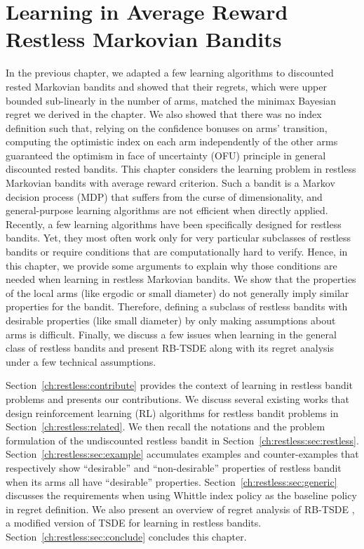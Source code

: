 \begingroup

\let\clearpage\relax

\chapter{Learning in Average Reward Restless Markovian Bandits}
\label{ch:learning_restless}

In the previous chapter, we adapted a few learning algorithms to discounted rested Markovian bandits and showed that their regrets, which were upper bounded sub-linearly in the number of arms, matched the minimax Bayesian regret we derived in the chapter.
We also showed that there was no index definition such that, relying on the confidence bonuses on arms' transition, computing the optimistic index on each arm independently of the other arms guaranteed the optimism in face of uncertainty (OFU) principle in general discounted rested bandits.
This chapter considers the learning problem in restless Markovian bandits with average reward criterion.
Such a bandit is a Markov decision process (MDP) that suffers from the curse of dimensionality, and general-purpose learning algorithms are not efficient when directly applied. Recently, a few learning algorithms have been specifically designed for restless bandits. Yet, they most often work only for very particular subclasses of restless bandits or require conditions that are computationally hard to verify.
Hence, in this chapter, we provide some arguments to explain why those conditions are needed when learning in restless Markovian bandits. We show that the properties of the local arms (like ergodic or small diameter) do not generally imply similar properties for the bandit. Therefore, defining a subclass of restless bandits with desirable properties (like small diameter) by only making assumptions about arms is difficult. 
Finally, we discuss a few issues when learning in the general class of restless bandits and present RB-TSDE \cite{akbarzadeh2022learning} along with its regret analysis under a few technical assumptions.

Section~\ref{ch:restless:contribute} provides the context of learning in restless bandit problems and presents our contributions.
We discuss several existing works that design reinforcement learning (RL) algorithms for restless bandit problems in Section~\ref{ch:restless:related}.
We then recall the notations and the problem formulation of the undiscounted restless bandit in Section~\ref{ch:restless:sec:restless}.
Section~\ref{ch:restless:sec:example} accumulates examples and counter-examples that respectively show ``desirable'' and ``non-desirable'' properties of restless bandit when its arms all have ``desirable'' properties.
Section~\ref{ch:restless:sec:generic} discusses the requirements when using Whittle index policy as the baseline policy in regret definition.
We also present an overview of regret analysis of RB-TSDE \cite{akbarzadeh2022learning}, a modified version of TSDE \cite{ouyang2017learning} for learning in restless bandits.
Section~\ref{ch:restless:sec:conclude} concludes this chapter.

